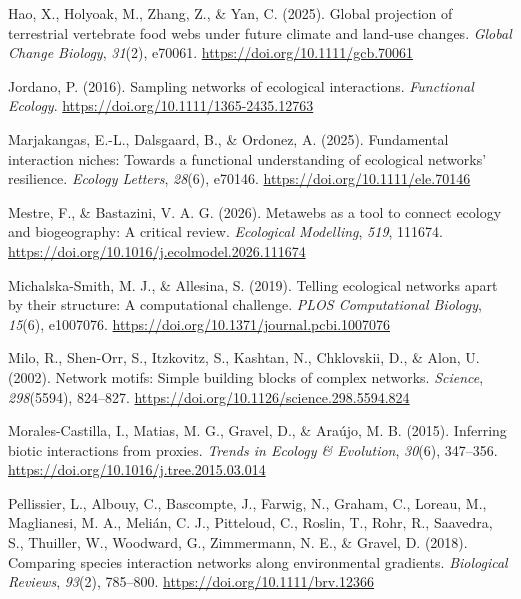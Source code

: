 \documentclass[
]{article}
\newlength{\cslhangindent}
\newenvironment{CSLReferences}[2] %
 {\begin{list}{}{%
  \setlength{\itemindent}{0pt}
  \setlength{\leftmargin}{0pt}
  \setlength{\parsep}{0pt}
  \ifodd #1
   \setlength{\leftmargin}{\cslhangindent}
   \setlength{\itemindent}{-1\cslhangindent}
  \fi
  \setlength{\itemsep}{#2\baselineskip}}}
 {\end{list}}
\begin{document}
\begin{CSLReferences}{1}{0}
Hao, X., Holyoak, M., Zhang, Z., \& Yan, C. (2025). Global projection of
terrestrial vertebrate food webs under future climate and land-use
changes. \emph{Global Change Biology}, \emph{31}(2), e70061.
\url{https://doi.org/10.1111/gcb.70061}

Jordano, P. (2016). Sampling networks of ecological interactions.
\emph{Functional Ecology}. \url{https://doi.org/10.1111/1365-2435.12763}

Marjakangas, E.-L., Dalsgaard, B., \& Ordonez, A. (2025). Fundamental
interaction niches: Towards a functional understanding of ecological
networks' resilience. \emph{Ecology Letters}, \emph{28}(6), e70146.
\url{https://doi.org/10.1111/ele.70146}

Mestre, F., \& Bastazini, V. A. G. (2026). Metawebs as a tool to connect
ecology and biogeography: A critical review. \emph{Ecological
Modelling}, \emph{519}, 111674.
\url{https://doi.org/10.1016/j.ecolmodel.2026.111674}

Michalska-Smith, M. J., \& Allesina, S. (2019). Telling ecological
networks apart by their structure: A computational challenge. \emph{PLOS
Computational Biology}, \emph{15}(6), e1007076.
\url{https://doi.org/10.1371/journal.pcbi.1007076}

Milo, R., Shen-Orr, S., Itzkovitz, S., Kashtan, N., Chklovskii, D., \&
Alon, U. (2002). Network motifs: Simple building blocks of complex
networks. \emph{Science}, \emph{298}(5594), 824--827.
\url{https://doi.org/10.1126/science.298.5594.824}

Morales-Castilla, I., Matias, M. G., Gravel, D., \& Araújo, M. B.
(2015). Inferring biotic interactions from proxies. \emph{Trends in
Ecology \& Evolution}, \emph{30}(6), 347--356.
\url{https://doi.org/10.1016/j.tree.2015.03.014}

Pellissier, L., Albouy, C., Bascompte, J., Farwig, N., Graham, C.,
Loreau, M., Maglianesi, M. A., Melián, C. J., Pitteloud, C., Roslin, T.,
Rohr, R., Saavedra, S., Thuiller, W., Woodward, G., Zimmermann, N. E.,
\& Gravel, D. (2018). Comparing species interaction networks along
environmental gradients. \emph{Biological Reviews}, \emph{93}(2),
785--800. \url{https://doi.org/10.1111/brv.12366}


\end{CSLReferences}
\end{document}
